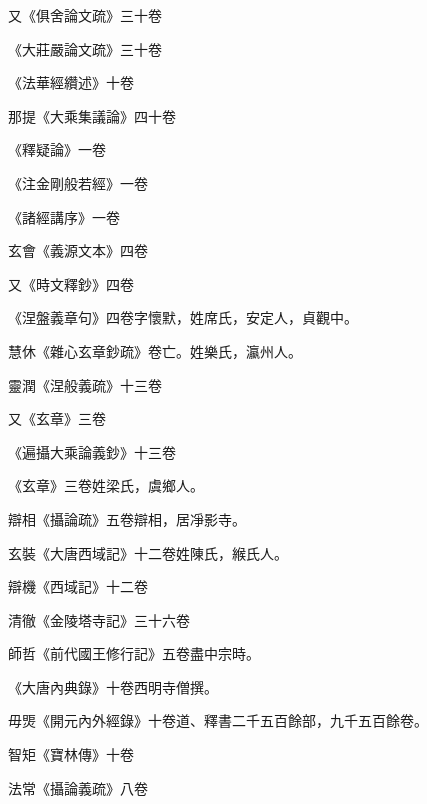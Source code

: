 \begin{pinyinscope}
 又《俱舍論文疏》三十卷



 《大莊嚴論文疏》三十卷



 《法華經纘述》十卷



 那提《大乘集議論》四十卷



 《釋疑論》一卷



 《注金剛般若經》一卷



 《諸經講序》一卷



 玄會《義源文本》四卷



 又《時文釋鈔》四卷



 《涅盤義章句》四卷字懷默，姓席氏，安定人，貞觀中。



 慧休《雜心玄章鈔疏》卷亡。姓樂氏，瀛州人。



 靈潤《涅般義疏》十三卷



 又《玄章》三卷



 《遍攝大乘論義鈔》十三卷



 《玄章》三卷姓梁氏，虞鄉人。



 辯相《攝論疏》五卷辯相，居凈影寺。



 玄裝《大唐西域記》十二卷姓陳氏，緱氏人。



 辯機《西域記》十二卷



 清徹《金陵塔寺記》三十六卷



 師哲《前代國王修行記》五卷盡中宗時。



 《大唐內典錄》十卷西明寺僧撰。



 毋煚《開元內外經錄》十卷道、釋書二千五百餘部，九千五百餘卷。



 智矩《寶林傳》十卷



 法常《攝論義疏》八卷




\end{pinyinscope}
